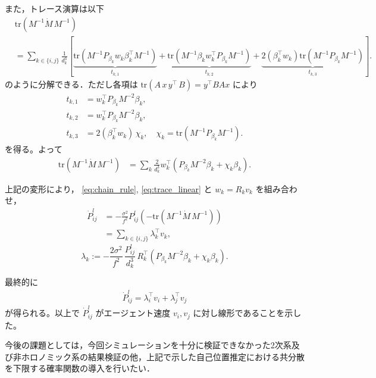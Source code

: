 また，トレース演算は以下
\begin{equation}
\begin{aligned}
&\mathrm{tr}\left(M^{-1}\dot M\,M^{-1}\right)\\
&=\sum_{k\in\{i,j\}}
\frac{1}{d_k^3}\left[
\underbrace{\mathrm{tr}(M^{-1}P_{\beta_k}w_k\beta_k^\top M^{-1})}_{t_{k,1}}
+\underbrace{\mathrm{tr}(M^{-1}\beta_k w_k^\top P_{\beta_k}M^{-1})}_{t_{k,2}}
+\underbrace{2(\beta_k^\top w_k)\mathrm{tr}(M^{-1}P_{\beta_k}M^{-1})}_{t_{k,3}}
\right].
\end{aligned}
\label{eq:trace_expand}
\end{equation}
のように分解できる．ただし各項は
$\mathrm{tr}(A\,x\,y^\top\,B)=y^\top B A x$
により
\begin{equation}
\begin{aligned}
t_{k,1}&=w_k^\top P_{\beta_k}M^{-2}\beta_k,\\
t_{k,2}&=w_k^\top P_{\beta_k}M^{-2}\beta_k,\\
t_{k,3}&=2(\beta_k^\top w_k)\,\chi_k,\quad
\chi_k=\mathrm{tr}(M^{-1}P_{\beta_k}M^{-1}).
\end{aligned}
\label{eq:t_terms}
\end{equation}
を得る。よって
\begin{equation}
\begin{aligned}
\mathrm{tr}\left(M^{-1}\dot M\,M^{-1}\right)
&=\sum_{k}
\frac{2}{d_k^3}
w_k^\top\left(P_{\beta_k}M^{-2}\beta_k + \chi_k\beta_k\right).
\end{aligned}
\label{eq:trace_linear}
\end{equation}

上記の変形により，
\eqref{eq:chain_rule}, \eqref{eq:trace_linear} と $w_k=R_k v_k$ を組み合わせ，
\begin{equation}
\begin{aligned}
\dot P_{ij}^l
&=-\frac{\sigma^2}{f^2}P_{ij}^l\left(-\mathrm{tr}(M^{-1}\dot M\,M^{-1})\right)\\
&=\sum_{k\in\{i,j\}}
\lambda_k^\top v_k,
\end{aligned}
\label{eq:Pdot_prel}
\end{equation}
\[
\lambda_k
:=-\frac{2\sigma^2}{f^2}\,
\frac{P_{ij}^l}{d_k^3}\,
R_k^\top\left(P_{\beta_k}M^{-2}\beta_k + \chi_k\beta_k\right).
\]

最終的に
\begin{equation}
\begin{aligned}
\dot P_{ij}^l
= \lambda_i^\top v_i + \lambda_j^\top v_j
\end{aligned}
\label{eq:Pdot_linear}
\end{equation}
が得られる。以上で
$\dot P_{ij}^l$ がエージェント速度 $v_i,v_j$ に対し線形であることを示した。

今後の課題としては，今回シミュレーションを十分に検証できなかった2次系及び非ホロノミック系の結果検証の他，上記で示した自己位置推定における共分散を下限する確率関数の導入を行いたい．
